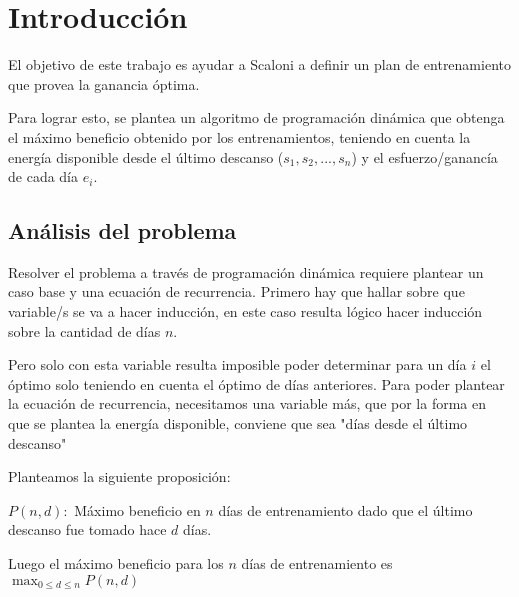 \section{Introducción}
El objetivo de este trabajo es ayudar a Scaloni a definir un plan de entrenamiento que provea la ganancia óptima.

Para lograr esto, se plantea un algoritmo de programación dinámica que obtenga el máximo beneficio obtenido por los entrenamientos, teniendo en cuenta la energía disponible desde el último descanso ($s_1, s_2, ...,s_n$) y el esfuerzo/ganancía de cada día $e_i$.

\subsection{Análisis del problema}
Resolver el problema a través de programación dinámica requiere plantear un caso base y una ecuación de recurrencia.
Primero hay que hallar sobre que variable/s se va a hacer inducción, en este caso resulta lógico hacer inducción sobre la cantidad de días $n$.

Pero solo con esta variable resulta imposible poder determinar para un día $i$ el óptimo solo teniendo en cuenta el óptimo de días anteriores.
Para poder plantear la ecuación de recurrencia, necesitamos una variable más, que por la forma en que se plantea la energía disponible, conviene que sea "días desde el último descanso"

Planteamos la siguiente proposición:

$P(n, d): $ Máximo beneficio en $n$ días de entrenamiento dado que el último descanso fue tomado hace $d$ días.

Luego el máximo beneficio para los $n$ días de entrenamiento es $\max_{0 \leq d \leq n} P(n, d)$